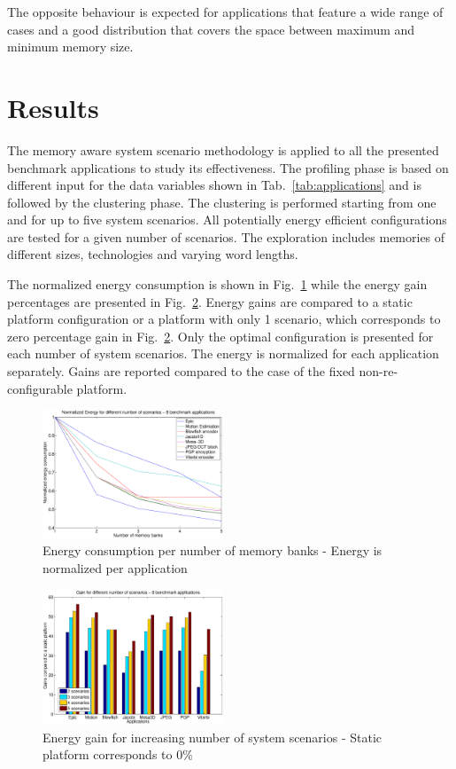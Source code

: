 \documentclass[a4paper,conference]{IEEEtran}
\begin{document}
The opposite behaviour is expected for applications that feature a wide range of cases and a good distribution that covers the space between maximum and minimum memory size.

\section{Results}
\label{sec:results}

The memory aware system scenario methodology is applied to all the presented benchmark applications to study its effectiveness. The profiling phase is based on different input for the data variables shown in Tab.~\ref{tab:applications} and is followed by the clustering phase. The clustering is performed starting from one and for up to five system scenarios. All potentially energy efficient configurations are tested for a given number of scenarios. The exploration includes memories of different sizes, technologies and varying word lengths. 

The normalized energy consumption is shown in Fig.~\ref{fig:energy} while the energy gain percentages are presented in Fig.~\ref{fig:gains}. Energy gains are compared to a static platform configuration or a platform with only 1 scenario, which corresponds to zero percentage gain in Fig.~\ref{fig:gains}. Only the optimal configuration is presented for each number of system scenarios. The energy is normalized for each application separately. Gains are reported compared to the case of the fixed non-re-configurable platform.

\begin{figure}[!t]
\centering
\includegraphics[width=0.48\textwidth]{Images/6apps.eps}
\caption{Energy consumption per number of memory banks - Energy is normalized per application}
\label{fig:energy}
\end{figure}

\begin{figure}[!t]
\centering
\includegraphics[width=0.48\textwidth]{Images/6appsGains.eps}
\caption{Energy gain for increasing number of system scenarios - Static platform corresponds to 0\%}
\label{fig:gains}
\end{figure}
\end{document}
